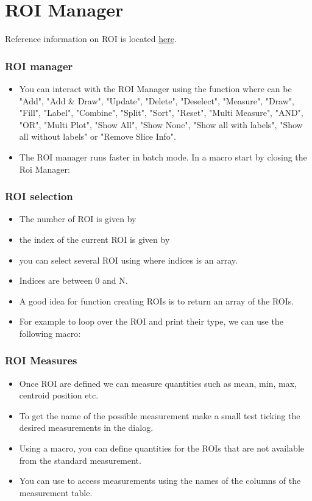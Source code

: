 \section{ROI Manager}
Reference information on ROI is located
\href{http://rsb.info.nih.gov/ij/developer/macro/functions.html#Roi}{here}.
\begin{frame}[fragile]
  \frametitle<presentation>{ROI manager}
  \begin{itemize}
   \item You can interact with the ROI Manager using the function
      where  can be "Add", "Add \&
     Draw", "Update", "Delete", "Deselect", "Measure", "Draw", "Fill",
     "Label", "Combine", "Split", "Sort", "Reset", "Multi Measure",
     "AND", "OR", "Multi Plot", "Show All", "Show None", "Show all with
     labels", "Show all without labels" or "Remove Slice Info".
   \item The ROI manager runs faster in batch mode. In a macro start
     by closing the Roi Manager:
     
  \end{itemize}
\end{frame}

\begin{frame}[fragile]
  \frametitle<presentation>{ROI selection}
  \begin{itemize}
    \item The number of ROI is given by 
    \item the index of the current ROI is given by 
    \item you can select several ROI using  where indices is an array.
    \item Indices are between 0 and N.
    \item A good idea for function creating ROIs is to return an array of the ROIs.
    \item For example to loop over the ROI and print their type, we
       can use the following macro:\par
       
  \end{itemize}
\end{frame}

\begin{frame}[fragile]
  \frametitle<presentation>{ROI Measures}
  \begin{itemize}
  \item Once ROI are defined we can measure quantities such as mean,
    min, max, centroid position etc.
  \item To get the name of the possible measurement make a small test
    ticking the desired measurements in the  dialog.
  \item Using a macro, you can define quantities for the ROIs that are not
    available from the standard measurement.
  \item You can use  to access measurements using the names
    of the columns of the measurement table.
  \end{itemize}
\end{frame}

